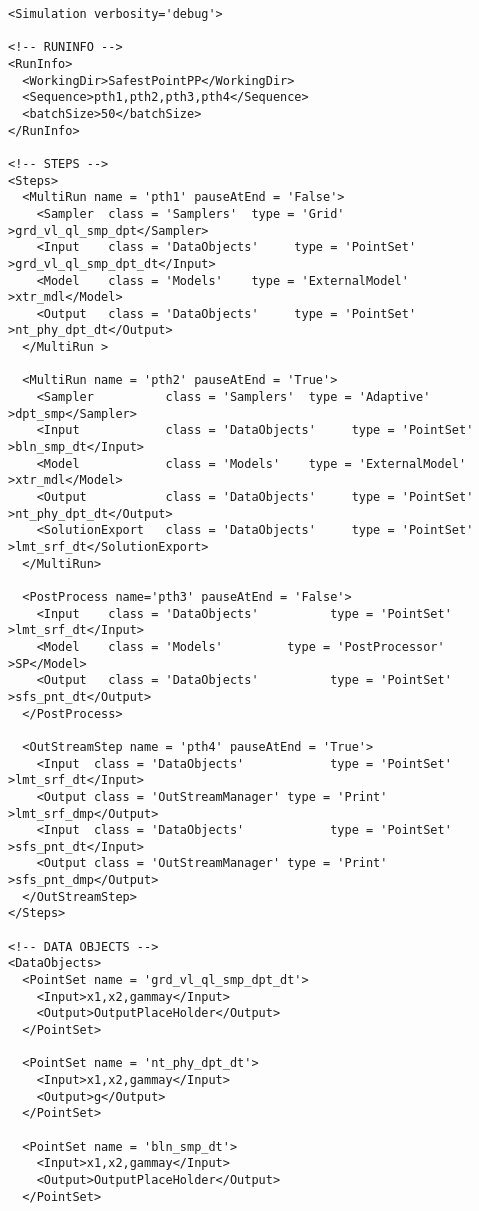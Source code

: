 \begin{lstlisting}[style=XML,morekeywords={debug,re,seeding,class,subType,limit}]
<Simulation verbosity='debug'>

<!-- RUNINFO -->
<RunInfo>
  <WorkingDir>SafestPointPP</WorkingDir>
  <Sequence>pth1,pth2,pth3,pth4</Sequence>
  <batchSize>50</batchSize>
</RunInfo>

<!-- STEPS -->
<Steps>  
  <MultiRun name = 'pth1' pauseAtEnd = 'False'>
    <Sampler  class = 'Samplers'  type = 'Grid'           >grd_vl_ql_smp_dpt</Sampler>
    <Input    class = 'DataObjects'     type = 'PointSet'   >grd_vl_ql_smp_dpt_dt</Input>
    <Model    class = 'Models'    type = 'ExternalModel'  >xtr_mdl</Model>
    <Output   class = 'DataObjects'     type = 'PointSet'   >nt_phy_dpt_dt</Output>    
  </MultiRun >
  
  <MultiRun name = 'pth2' pauseAtEnd = 'True'>
    <Sampler          class = 'Samplers'  type = 'Adaptive'      >dpt_smp</Sampler>
    <Input            class = 'DataObjects'     type = 'PointSet'  >bln_smp_dt</Input>   
    <Model            class = 'Models'    type = 'ExternalModel' >xtr_mdl</Model>
    <Output           class = 'DataObjects'     type = 'PointSet'  >nt_phy_dpt_dt</Output>            
    <SolutionExport   class = 'DataObjects'     type = 'PointSet'  >lmt_srf_dt</SolutionExport>
  </MultiRun>
  
  <PostProcess name='pth3' pauseAtEnd = 'False'>
    <Input    class = 'DataObjects'          type = 'PointSet'       >lmt_srf_dt</Input>
    <Model    class = 'Models'         type = 'PostProcessor'  >SP</Model>
    <Output   class = 'DataObjects'          type = 'PointSet'     >sfs_pnt_dt</Output>
  </PostProcess>  
  
  <OutStreamStep name = 'pth4' pauseAtEnd = 'True'>
  	<Input  class = 'DataObjects'            type = 'PointSet'  >lmt_srf_dt</Input>
  	<Output class = 'OutStreamManager' type = 'Print'         >lmt_srf_dmp</Output>
    <Input  class = 'DataObjects'            type = 'PointSet'  >sfs_pnt_dt</Input>
  	<Output class = 'OutStreamManager' type = 'Print'         >sfs_pnt_dmp</Output>
  </OutStreamStep>
</Steps>

<!-- DATA OBJECTS -->
<DataObjects> 
  <PointSet name = 'grd_vl_ql_smp_dpt_dt'>
    <Input>x1,x2,gammay</Input>
    <Output>OutputPlaceHolder</Output>
  </PointSet>
  
  <PointSet name = 'nt_phy_dpt_dt'>
    <Input>x1,x2,gammay</Input>
    <Output>g</Output>
  </PointSet>
    
  <PointSet name = 'bln_smp_dt'>
    <Input>x1,x2,gammay</Input>
    <Output>OutputPlaceHolder</Output>
  </PointSet>
    

\end{lstlisting}
